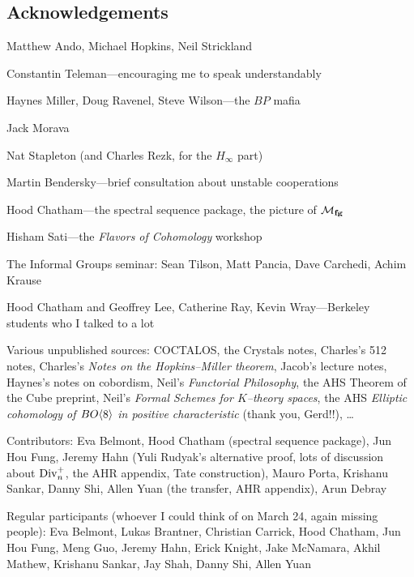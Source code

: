 


\newpage

\subsection*{Acknowledgements}

Matthew Ando, Michael Hopkins, Neil Strickland

Constantin Teleman---encouraging me to speak understandably

Haynes Miller, Doug Ravenel, Steve Wilson---the $BP$ mafia

Jack Morava

Nat Stapleton (and Charles Rezk, for the $H_\infty$ part)

Martin Bendersky---brief consultation about unstable cooperations

Hood Chatham---the spectral sequence package, the picture of $\mathcal{M}_{\mathbf{fg}}$

Hisham Sati---the \textit{Flavors of Cohomology} workshop

The Informal Groups seminar: Sean Tilson, Matt Pancia, Dave Carchedi, Achim Krause

Hood Chatham and Geoffrey Lee, Catherine Ray, Kevin Wray---Berkeley students who I talked to a lot

Various unpublished sources: COCTALOS, the Crystals notes, Charles's 512 notes, Charles's \textit{Notes on the Hopkins--Miller theorem}, Jacob's lecture notes, Haynes's notes on cobordism, Neil's \textit{Functorial Philosophy}, the AHS Theorem of the Cube preprint, Neil's \textit{Formal Schemes for $K$--theory spaces}, the AHS \textit{Elliptic cohomology of $BO\langle8\rangle$ in positive characteristic} (thank you, Gerd!!), \ldots





Contributors: Eva Belmont, Hood Chatham (spectral sequence package), Jun Hou Fung, Jeremy Hahn (Yuli Rudyak's alternative proof, lots of discussion about $\operatorname{Div}_n^+$, the AHR appendix, Tate construction), Mauro Porta, Krishanu Sankar, Danny Shi, Allen Yuan (the transfer, AHR appendix), Arun Debray

Regular participants (whoever I could think of on March 24, again missing people): Eva Belmont, Lukas Brantner, Christian Carrick, Hood Chatham, Jun Hou Fung, Meng Guo, Jeremy Hahn, Erick Knight, Jake McNamara, Akhil Mathew, Krishanu Sankar, Jay Shah, Danny Shi, Allen Yuan

